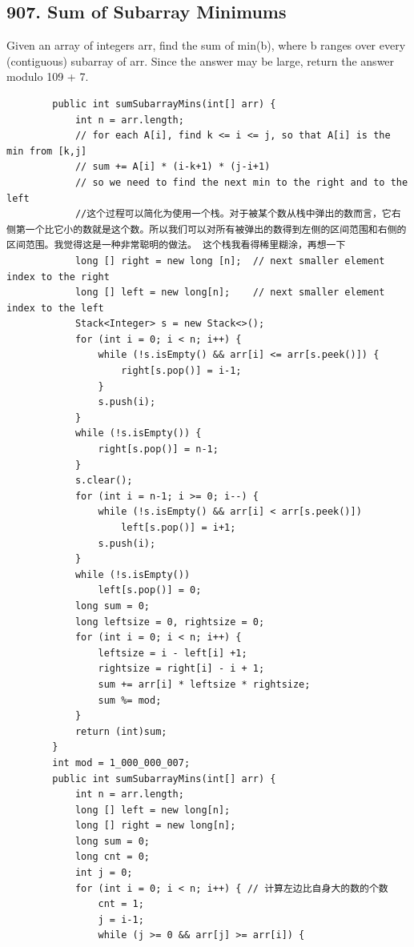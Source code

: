 \documentclass[9pt, b5paper]{article}
\begin{document}
\subsection{907. Sum of Subarray Minimums}
\label{sec-4-38}
Given an array of integers arr, find the sum of min(b), where b ranges over every (contiguous) subarray of arr. Since the answer may be large, return the answer modulo 109 + 7.
\begin{verbatim}
        public int sumSubarrayMins(int[] arr) {
            int n = arr.length;
            // for each A[i], find k <= i <= j, so that A[i] is the min from [k,j]
            // sum += A[i] * (i-k+1) * (j-i+1)
            // so we need to find the next min to the right and to the left
            //这个过程可以简化为使用一个栈。对于被某个数从栈中弹出的数而言，它右侧第一个比它小的数就是这个数。所以我们可以对所有被弹出的数得到左侧的区间范围和右侧的区间范围。我觉得这是一种非常聪明的做法。 这个栈我看得稀里糊涂，再想一下
            long [] right = new long [n];  // next smaller element index to the right 
            long [] left = new long[n];    // next smaller element index to the left
            Stack<Integer> s = new Stack<>();
            for (int i = 0; i < n; i++) {
                while (!s.isEmpty() && arr[i] <= arr[s.peek()]) {
                    right[s.pop()] = i-1;
                }
                s.push(i);
            }
            while (!s.isEmpty()) {
                right[s.pop()] = n-1;
            }
            s.clear();
            for (int i = n-1; i >= 0; i--) {
                while (!s.isEmpty() && arr[i] < arr[s.peek()])
                    left[s.pop()] = i+1;
                s.push(i);
            }
            while (!s.isEmpty())
                left[s.pop()] = 0;
            long sum = 0;
            long leftsize = 0, rightsize = 0;
            for (int i = 0; i < n; i++) {
                leftsize = i - left[i] +1;
                rightsize = right[i] - i + 1;
                sum += arr[i] * leftsize * rightsize;
                sum %= mod;
            }
            return (int)sum;
        }
        int mod = 1_000_000_007;
        public int sumSubarrayMins(int[] arr) {
            int n = arr.length;
            long [] left = new long[n];
            long [] right = new long[n];
            long sum = 0;
            long cnt = 0;
            int j = 0;
            for (int i = 0; i < n; i++) { // 计算左边比自身大的数的个数
                cnt = 1;
                j = i-1;
                while (j >= 0 && arr[j] >= arr[i]) {

\end{verbatim}
\end{document}
